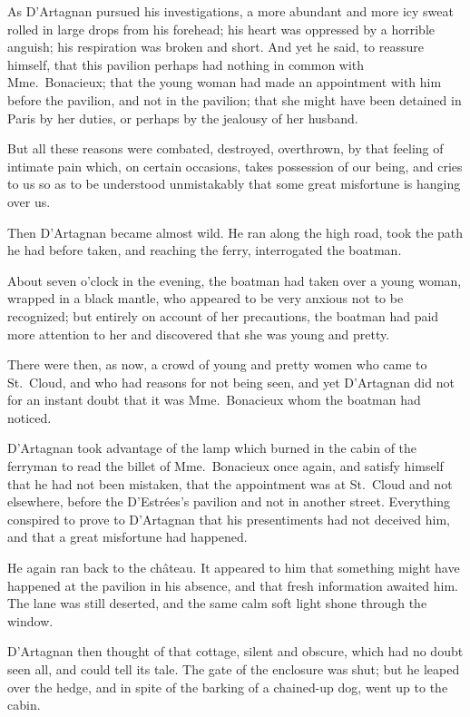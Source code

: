 As D'Artagnan pursued his investigations, a more abundant and more icy sweat rolled in large drops from his forehead; his heart was oppressed by a horrible anguish; his respiration was broken and short. And yet he said, to reassure himself, that this pavilion perhaps had nothing in common with Mme.~Bonacieux; that the young woman had made an appointment with him before the pavilion, and not in the pavilion; that she might have been detained in Paris by her duties, or perhaps by the jealousy of her husband. 

But all these reasons were combated, destroyed, overthrown, by that feeling of intimate pain which, on certain occasions, takes possession of our being, and cries to us so as to be understood unmistakably that some great misfortune is hanging over us. 

Then D'Artagnan became almost wild. He ran along the high road, took the path he had before taken, and reaching the ferry, interrogated the boatman. 

About seven o'clock in the evening, the boatman had taken over a young woman, wrapped in a black mantle, who appeared to be very anxious not to be recognized; but entirely on account of her precautions, the boatman had paid more attention to her and discovered that she was young and pretty. 

There were then, as now, a crowd of young and pretty women who came to St.~Cloud, and who had reasons for not being seen, and yet D'Artagnan did not for an instant doubt that it was Mme.~Bonacieux whom the boatman had noticed. 

D'Artagnan took advantage of the lamp which burned in the cabin of the ferryman to read the billet of Mme.~Bonacieux once again, and satisfy himself that he had not been mistaken, that the appointment was at St.~Cloud and not elsewhere, before the D'Estrées's pavilion and not in another street. Everything conspired to prove to D'Artagnan that his presentiments had not deceived him, and that a great misfortune had happened. 

He again ran back to the château. It appeared to him that something might have happened at the pavilion in his absence, and that fresh information awaited him. The lane was still deserted, and the same calm soft light shone through the window. 

D'Artagnan then thought of that cottage, silent and obscure, which had no doubt seen all, and could tell its tale. The gate of the enclosure was shut; but he leaped over the hedge, and in spite of the barking of a chained-up dog, went up to the cabin. 

